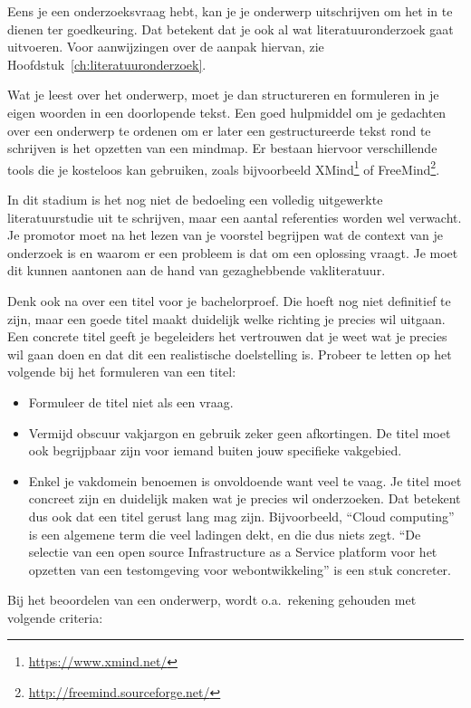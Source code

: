 Eens je een onderzoeksvraag hebt, kan je je onderwerp uitschrijven om het in te dienen ter goedkeuring. Dat betekent dat je ook al wat literatuuronderzoek gaat uitvoeren. Voor aanwijzingen over de aanpak hiervan, zie Hoofdstuk~\ref{ch:literatuuronderzoek}.

Wat je leest over het onderwerp, moet je dan structureren en formuleren in je eigen woorden in een doorlopende tekst. Een goed hulpmiddel om je gedachten over een onderwerp te ordenen om er later een gestructureerde tekst rond te schrijven is het opzetten van een mindmap. Er bestaan hiervoor verschillende tools die je kosteloos kan gebruiken, zoals bijvoorbeeld XMind\footnote{\url{https://www.xmind.net/}} of FreeMind\footnote{\url{http://freemind.sourceforge.net/}}.

In dit stadium is het nog niet de bedoeling een volledig uitgewerkte literatuurstudie uit te schrijven, maar een aantal referenties worden wel verwacht. Je promotor moet na het lezen van je voorstel begrijpen wat de context van je onderzoek is en waarom er een probleem is dat om een oplossing vraagt. Je moet dit kunnen aantonen aan de hand van gezaghebbende vakliteratuur.

Denk ook na over een titel voor je bachelorproef. Die hoeft nog niet definitief te zijn, maar een goede titel maakt duidelijk welke richting je precies wil uitgaan. Een concrete titel geeft je begeleiders het vertrouwen dat je weet wat je precies wil gaan doen en dat dit een realistische doelstelling is. Probeer te letten op het volgende bij het formuleren van een titel:

\begin{itemize}
  \item Formuleer de titel niet als een vraag.
  \item Vermijd obscuur vakjargon en gebruik zeker geen afkortingen. De titel moet ook begrijpbaar zijn voor iemand buiten jouw specifieke vakgebied.
  \item Enkel je vakdomein benoemen is onvoldoende want veel te vaag. Je titel moet concreet zijn en duidelijk maken wat je precies wil onderzoeken. Dat betekent dus ook dat een titel gerust lang mag zijn. Bijvoorbeeld, ``Cloud computing'' is een algemene term die veel ladingen dekt, en die dus niets zegt. ``De selectie van een open source Infrastructure as a Service platform voor het opzetten van een testomgeving voor webontwikkeling'' is een stuk concreter.
\end{itemize}

Bij het beoordelen van een onderwerp, wordt o.a.\ rekening gehouden met volgende criteria:

